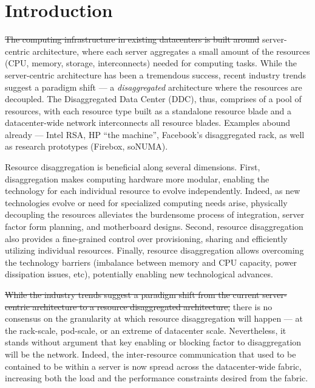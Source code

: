 \section{Introduction}
\label{sec:intro}

\st{The computing infrastructure in existing datacenters is built around}  server-centric architecture, where each server aggregates a small amount of the resources (CPU, memory, storage, interconnects) needed for computing tasks. While the server-centric architecture has been a tremendous success, recent industry trends suggest a paradigm shift --- a {\em disaggregated} architecture where the resources are decoupled. The Disaggregated Data Center (DDC), thus, comprises of a pool of resources, with each resource type built as a standalone resource blade and a datacenter-wide network interconnects all resource blades. Examples abound already --- Intel RSA, HP ``the machine'', Facebook's disaggregated rack, as well as research prototypes (Firebox, soNUMA).

Resource disaggregation is beneficial along several dimensions. First, disaggregation makes computing hardware more modular, enabling the technology for each individual resource to evolve independently. Indeed, as new technologies evolve or need for specialized computing needs arise, physically decoupling the resources alleviates the burdensome process of integration, server factor form planning, and motherboard designs. Second, resource disaggregation also provides a fine-grained control over provisioning, sharing and efficiently utilizing individual resources. Finally, resource disaggregation allows overcoming the technology barriers (imbalance between memory and CPU capacity, power dissipation issues, etc), potentially enabling new technological advances. 


\st{While the industry trends suggest a paradigm shift from the current server-centric architecture to a resource disaggregated architecture,}  there is no consensus on the granularity at which resource disaggregation will happen --- at the rack-scale, pod-scale, or an extreme of datacenter scale. 
Nevertheless, it stands without argument that key enabling or blocking factor to disaggregation will be the network. Indeed, the inter-resource communication that used to be contained to be within a server is now spread across the datacenter-wide fabric, increasing both the load and the performance constraints desired from the fabric.

